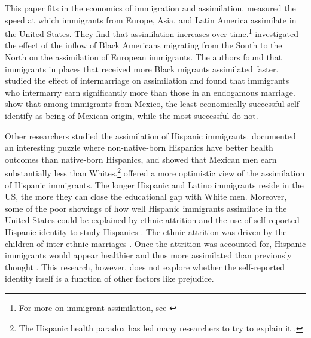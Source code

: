 \documentclass[12pt,english]{article}
\begin{document}
This paper fits in the economics of immigration and assimilation. \textcite{abramitzkyCulturalAssimilationAge2016} measured the speed at which immigrants from Europe, Asia, and Latin America assimilate in the United States. They find that assimilation increases over time.\footnote{For more on immigrant assimilation, see \textcite{abramitzkyLeavingEnclaveHistorical2020,abramitzkyIntergenerationalMobilityImmigrants2019,abramitzkyDiscriminationReturnsCultural2020,abramitzkyNationImmigrantsAssimilation2014}} \textcite{foukaImmigrantsAmericansRace2022} investigated the effect of the inflow of Black Americans migrating from the South to the North on the assimilation of European immigrants. The authors found that immigrants in places that received more Black migrants assimilated faster.  \textcite{mengIntermarriageEconomicAssimilation2005} studied the effect of intermarriage on assimilation and found that immigrants who intermarry earn significantly more than those in an endogamous marriage. \textcite{antmanEthnicAttritionObserved2016} show that among immigrants from Mexico, the least economically successful self-identify as being of Mexican origin, while the most successful do not.

Other researchers studied the assimilation of Hispanic immigrants. \textcite{antecolUnhealthyAssimilationWhy2006} documented an interesting puzzle where non-native-born Hispanics have better health outcomes than native-born Hispanics, and \textcite{trejoWhyMexicanAmericans1997} showed that Mexican men earn substantially less than Whites.\footnote{The Hispanic health paradox has led many researchers to try to explain it \autocite{giuntellaAssimilationHealthEvidence2016,giuntellaAccelerationImmigrantUnhealthy2017,giuntellaReasonImmigrationImmigrants2018,giuntellaWhyDoesHealth2017a,antmanEthnicAttritionObserved2016,antmanEthnicAttritionAssimilation2020}.} \textcite{smithAssimilationLatinoGenerations2003} offered a more optimistic view of the assimilation of Hispanic immigrants. The longer Hispanic and Latino immigrants reside in the US, the more they can close the educational gap with White men. Moreover, some of the poor showings of how well Hispanic immigrants assimilate in the United States could be explained by ethnic attrition and the use of self-reported Hispanic identity to study Hispanics \autocite{duncanComplexityImmigrantGenerations2017,duncanWhoRemainsMexican2011,mengIntermarriageEconomicAssimilation2005,duncanIdentifyingLaterGenerationDescendants2018,duncanSocioeconomicIntegrationImmigrant2018,antmanEthnicAttritionObserved2016,antmanEthnicAttritionAssimilation2020}. The ethnic attrition was driven by the children of inter-ethnic marriages \autocite{mengIntermarriageEconomicAssimilation2005,duncanEthnicIdentificationIntermarriage2005}. Once the attrition was accounted for, Hispanic immigrants would appear healthier and thus more assimilated than previously thought \autocite{antmanEthnicAttritionObserved2016,antmanEthnicAttritionAssimilation2020}. This research, however, does not explore whether the self-reported identity itself is a function of other factors like prejudice. 
\end{document}
